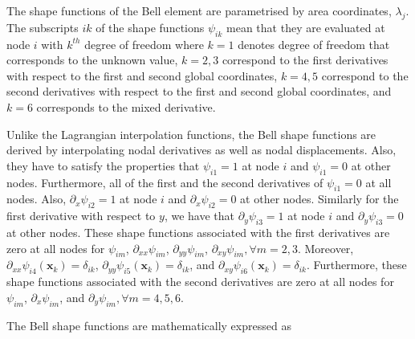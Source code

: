 The shape functions of the Bell element are parametrised by area coordinates, $\lambda_j$. The subscripts $ik$ of the shape functions $\psi_{ik}$ mean that they are evaluated at node $i$ with $k^{th}$ degree of freedom where $k=1$ denotes degree of freedom that corresponds to the unknown value, $k=2,3$ correspond to the first derivatives with respect to the first and second global coordinates, $k=4,5$ correspond to the second derivatives with respect to the first and second global coordinates, and $k=6$ corresponds to the mixed derivative.

Unlike the Lagrangian interpolation functions, the Bell shape functions are derived by interpolating nodal derivatives as well as nodal displacements. Also, they have to satisfy the properties that $\psi_{i1} = 1$ at node $i$ and $\psi_{i1} = 0$ at other nodes. Furthermore, all of the first and the second derivatives of $\psi_{i1} = 0$ at all nodes. Also, $\partial_{x}\psi_{i2} = 1$ at node $i$ and $\partial_{x}\psi_{i2} = 0$ at other nodes. Similarly for the first derivative with respect to $y$, we have that $\partial_{y}\psi_{i3} = 1$ at node $i$ and $\partial_{y}\psi_{i3} = 0$ at other nodes. These shape functions associated with the first derivatives are zero at all nodes for $\psi_{im}$, $\partial_{xx}\psi_{im}$, $\partial_{yy}\psi_{im}$, $\partial_{xy}\psi_{im}, \forall m=2,3$. Moreover, $\partial_{xx}\psi_{i4}(\mathbf{x}_{k}) = \delta_{ik}$, $\partial_{yy}\psi_{i5}(\mathbf{x}_{k}) = \delta_{ik}$, and $\partial_{xy}\psi_{i6}(\mathbf{x}_{k}) = \delta_{ik}$. Furthermore, these shape functions associated with the second derivatives are zero at all nodes for $\psi_{im}$, $\partial_{x}\psi_{im}$, and $\partial_{y}\psi_{im}, \forall m=4,5,6$.

The Bell shape functions are mathematically expressed as

